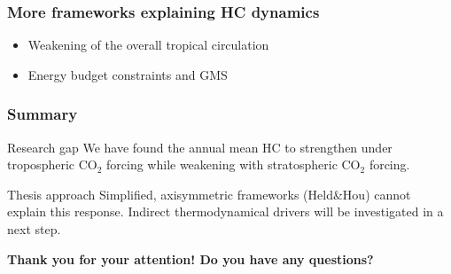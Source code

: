 \documentclass{beamer}
\begin{document}
\begin{frame}
    \frametitle{More frameworks explaining HC dynamics}
    \begin{itemize}
        \item Weakening of the overall tropical circulation \cite{VecchiSoden2007}
        \item Energy budget constraints and GMS \cite{ChouChen2010}
    \end{itemize}
\end{frame}

\begin{frame}
    \frametitle{Summary}
    \begin{alertblock}{Research gap}
        We have found the annual mean HC to strengthen under tropospheric CO$_2$ forcing
        while weakening with stratospheric CO$_2$ forcing.
    \end{alertblock}
    \begin{block}{Thesis approach}
        Simplified, axisymmetric frameworks (Held\&Hou) cannot explain this response.
        Indirect thermodynamical drivers will be investigated in a next step.
    \end{block}
    \vfill
    \begin{center}
    \textbf{Thank you for your attention! Do you have any questions?}
    \end{center} 
\end{frame}



\end{document}
